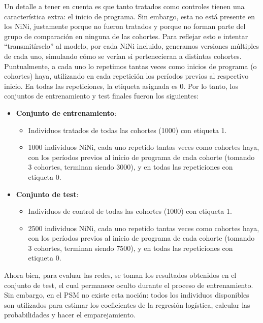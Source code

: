 \documentclass[../../main.tex]{subfiles}
\begin{document}
Un detalle a tener en cuenta es que tanto tratados como controles tienen una
característica extra: el inicio de programa. Sin embargo, esta no está presente en los
NiNi, justamente porque no fueron tratados y porque no forman parte del grupo de
comparación en ninguna de las cohortes. Para reflejar esto e intentar ``transmitírselo''
al modelo, por cada NiNi incluido, generamos versiones múltiples de cada uno, simulando
cómo se verían si pertenecieran a distintas cohortes. Puntualmente, a cada uno lo
repetimos tantas veces como inicios de programa (o cohortes) haya, utilizando en cada
repetición los períodos previos al respectivo inicio. En todas las repeticiones, la
etiqueta asignada es 0. Por lo tanto, los conjuntos de entrenamiento y test finales fueron
los siguientes:
\begin{itemize}
    \item \textbf{Conjunto de entrenamiento}:\vspace{-0.2cm}
        \begin{itemize}
            \item Individuos tratados de todas las cohortes (1000) con etiqueta 1.
            \item 1000 individuos NiNi, cada uno repetido tantas veces como cohortes haya,
            con los períodos previos al inicio de programa de cada cohorte (tomando 3 cohortes,
            terminan siendo 3000), y en todas las repeticiones con etiqueta 0.
        \end{itemize}
    \item \textbf{Conjunto de test}:\vspace{-0.2cm}
        \begin{itemize}
            \item Individuos de control de todas las cohortes (1000) con etiqueta 1.
            \item 2500 individuos NiNi, cada uno repetido tantas veces como cohortes haya,
            con los períodos previos al inicio de programa de cada cohorte (tomando 3
            cohortes, terminan siendo 7500), y en todas las repeticiones con etiqueta 0.
        \end{itemize}
\end{itemize}

Ahora bien, para evaluar las redes, se toman los resultados obtenidos en el conjunto de
test, el cual permanece oculto durante el proceso de entrenamiento. Sin embargo, en el PSM
no existe esta noción: todos los individuos disponibles son utilizados para estimar los
coeficientes de la regresión logística, calcular las probabilidades y hacer el
emparejamiento.
\end{document}
